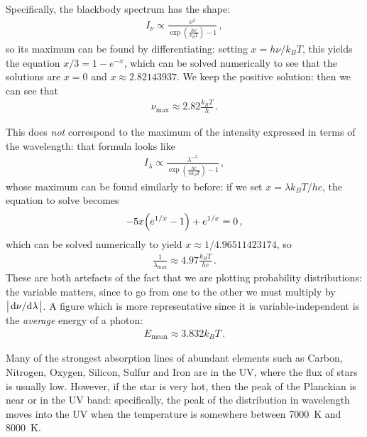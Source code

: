 \documentclass[main.tex]{subfiles}
\begin{document}
\begin{bluebox}
Specifically, the blackbody spectrum has the shape: 
%
\begin{align}
I_\nu \propto \frac{\nu^3}{\exp(\frac{h \nu }{k_B T}) - 1}
\,,
\end{align}
%
so its maximum can be found by differentiating: setting \(x = h \nu / k_B T\), this yields the equation \(x/3 = 1- e^{-x}\), which can be solved numerically to see that the solutions are \(x=0\) and \(x \approx\num{2.82143937}\).
We keep the positive solution: then we can see that 
%
\begin{align}
\nu _{\text{max}} \approx \num{2.82} \frac{k_B T}{h}
\,.
\end{align}

This does \emph{not} correspond to the maximum of the intensity expressed in terms of the wavelength: that formula looks like 
%
\begin{align}
I_\lambda \propto \frac{\lambda^{-5}}{\exp(\frac{hc}{\lambda k_B T}) - 1}
\,,
\end{align}
%
whose maximum can be found similarly to before: if we set \(x = \lambda k_B T / hc\), the equation to solve becomes 
%
\begin{align}
-5 x \qty(e^{1/x} -1) + e^{1/x} = 0
\,,
\end{align}
%
which can be solved numerically to yield \(x \approx 1/\num{4.96511423174}\), so 
%
\begin{align}
\frac{1}{\lambda _{\text{max}}} \approx 4.97 \frac{k_B T}{hc}
\,.
\end{align}
%
These are both artefacts of the fact that we are plotting probability distributions: the variable matters, since to go from one to the other we must multiply by \(\abs{\dv*{\nu }{\lambda }}\).
A figure which is more representative since it is variable-independent is the \emph{average} energy of a photon: 
%
\begin{align}
E _{\text{mean}} \approx 3.832 k_B T
\,.
\end{align}
\end{bluebox}

Many of the strongest absorption lines of abundant elements such as Carbon, Nitrogen, Oxygen, Silicon, Sulfur and Iron are in the UV, where the flux of stars is usually low. However, if the star is very hot, then the peak of the Planckian is near or in the UV band: specifically, the peak of the distribution in wavelength moves into the UV when the temperature is somewhere between \SI{7000}{K} and \SI{8000}{K}.
\end{document}
